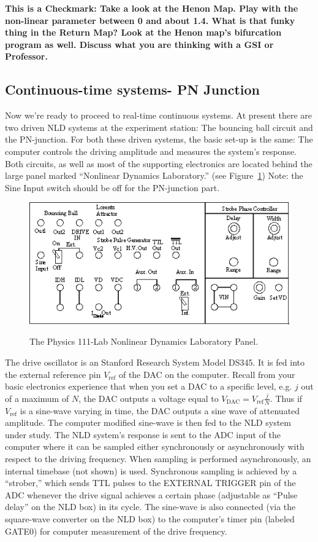 \documentclass{../lab}
\begin{document}
\textbf{This is a Checkmark: Take a look at the Henon Map. Play with the non-linear parameter between 0 and about 1.4. What is that funky thing in the Return Map? Look at the Henon map's bifurcation program as well. Discuss what you are thinking with a GSI or Professor.}

\subsection{Continuous-time systems- PN Junction}

Now we're ready to proceed to real-time continuous systems. At present there are two driven NLD systems at the experiment station: The bouncing ball circuit and the PN-junction. For both these driven systems, the basic set-up is the same: The computer controls the driving amplitude and measures the system's response. Both circuits, as well as most of the supporting electronics are located behind the large panel marked ``Nonlinear Dynamics Laboratory.'' (see Figure~\ref{fig:NonlinearDynamicsLaboratoryPanel}) Note: the Sine Input switch should be off for the PN-junction part.

\begin{figure}[h]
    \centering
    \href{http://experimentationlab.berkeley.edu/sites/default/files/images/Nldimage115.gif}{\includegraphics[width=0.7\linewidth]{images/Nldimage115.png}}
    \caption{The Physics 111-Lab Nonlinear Dynamics Laboratory Panel.}
    \label{fig:NonlinearDynamicsLaboratoryPanel}
\end{figure}

The drive oscillator is an Stanford Research System Model DS345. It is fed into the external reference pin $V_\text{ref}$ of the DAC on the computer. Recall from your basic electronics experience that when you set a DAC to a specific level, e.g. $j$ out of a maximum of $N$, the DAC outputs a voltage equal to $V_\text{DAC} = V_\text{ref} \frac{j}{N}$. Thus if $V_\text{ref}$ is a sine-wave varying in time, the DAC outputs a sine wave of attenuated amplitude. The computer modified sine-wave is then fed to the NLD system under study. The NLD system's response is sent to the ADC input of the computer where it can be sampled either synchronously or asynchronously with respect to the driving frequency. When sampling is performed asynchronously, an internal timebase (not shown) is used. Synchronous sampling is achieved by a ``strober,'' which sends TTL pulses to the EXTERNAL TRIGGER pin of the ADC whenever the drive signal achieves a certain phase (adjustable as ``Pulse delay'' on the NLD box) in its cycle. The sine-wave is also connected (via the square-wave converter on the NLD box) to the computer's timer pin (labeled GATE0) for computer measurement of the drive frequency.
\end{document}
